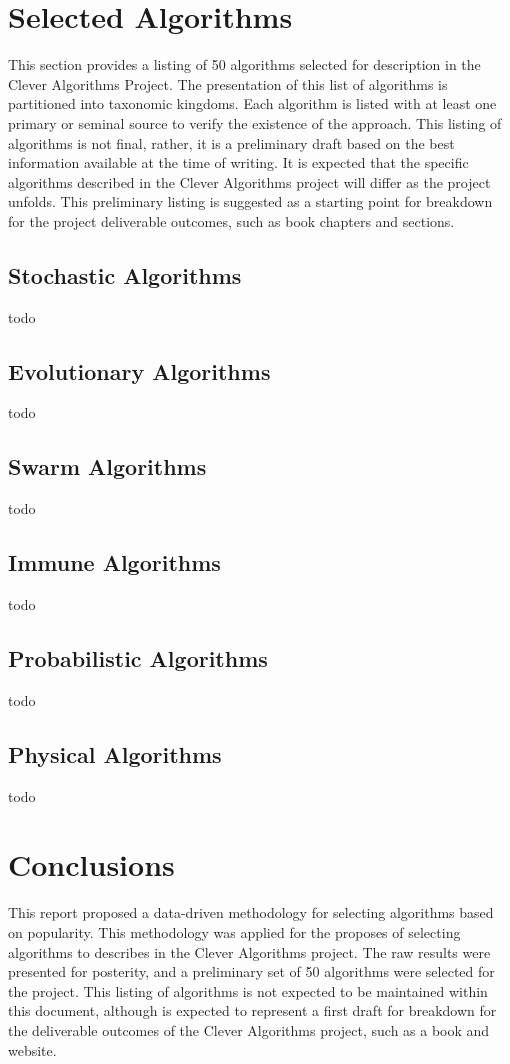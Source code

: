 \documentclass[a4paper, 11pt]{article}
\begin{document}
% 
% 
\section{Selected Algorithms}
\label{sec:selection}
This section provides a listing of 50 algorithms selected for description in the Clever Algorithms Project. The presentation of this list of algorithms is partitioned into taxonomic kingdoms. Each algorithm is listed with at least one primary or seminal source to verify the existence of the approach. This listing of algorithms is not final, rather, it is a preliminary draft based on the best information available at the time of writing. It is expected that the specific algorithms described in the Clever Algorithms project will differ as the project unfolds. This preliminary listing is suggested as a starting point for breakdown for the project deliverable outcomes, such as book chapters and sections.

\subsection{Stochastic Algorithms}
todo

\subsection{Evolutionary Algorithms}
todo

\subsection{Swarm Algorithms}
todo

\subsection{Immune Algorithms}
todo

\subsection{Probabilistic Algorithms}
todo

\subsection{Physical Algorithms}
todo

% 
% 
\section{Conclusions}
\label{sec:conclusions}
This report proposed a data-driven methodology for selecting algorithms based on popularity. This methodology was applied for the proposes of selecting algorithms to describes in the Clever Algorithms project. The raw results were presented for posterity, and a preliminary set of 50 algorithms were selected for the project. This listing of algorithms is not expected to be maintained within this document, although is expected to represent a first draft for breakdown for the deliverable outcomes of the Clever Algorithms project, such as a book and website. 
\end{document}
